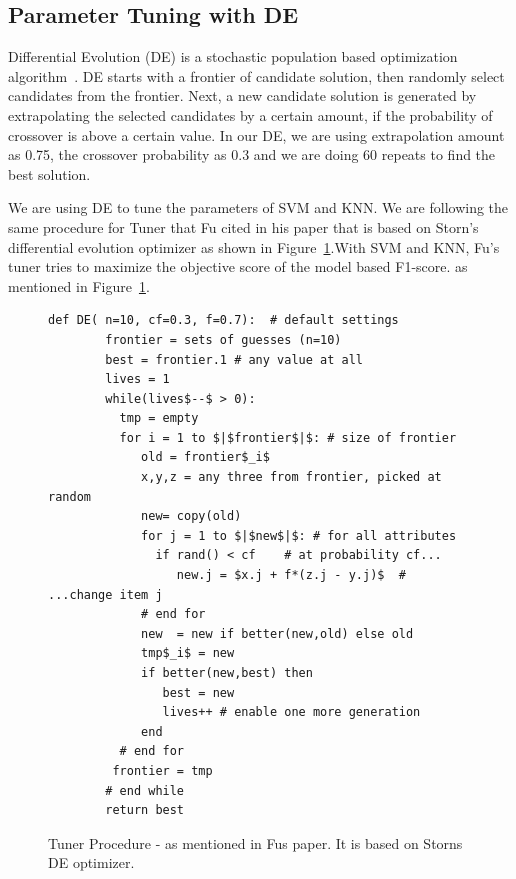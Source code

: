 \documentclass[sigconf]{acmart}
\theoremstyle{break}
\begin{document}
    \subsection{Parameter Tuning with DE}
    \label{sssec:Parameter Tuning with DE}
    Differential Evolution (DE) is a stochastic population based optimization algorithm~\cite{storn1997differential}. DE starts with a frontier of candidate solution, then randomly select candidates from the frontier. Next, a new candidate solution is generated by extrapolating the selected candidates by a certain amount, if the probability of crossover is above a certain value. In our DE, we are using extrapolation amount as 0.75, the crossover probability as 0.3 and we are doing 60 repeats to find the best solution.
    
    We are using DE to tune the parameters of SVM and KNN. We are following the same procedure for Tuner that Fu cited in his paper that is based on Storn's differential evolution optimizer as shown in Figure~\ref{fig:pseudo_DE}.With SVM and KNN, Fu's tuner tries to maximize the objective score of the model based F1-score. as mentioned in Figure~\ref{fig:pseudo_DE}.
    
    \begin{figure}[!t]
    \small 
    \begin{lstlisting}[mathescape,linewidth=6.7cm,frame=none,numbers=right ]
      def DE( n=10, cf=0.3, f=0.7):  # default settings
        frontier = sets of guesses (n=10)
        best = frontier.1 # any value at all
        lives = 1
        while(lives$--$ > 0): 
          tmp = empty
          for i = 1 to $|$frontier$|$: # size of frontier
             old = frontier$_i$
             x,y,z = any three from frontier, picked at random
             new= copy(old)  
             for j = 1 to $|$new$|$: # for all attributes
               if rand() < cf    # at probability cf...
                  new.j = $x.j + f*(z.j - y.j)$  # ...change item j
             # end for
             new  = new if better(new,old) else old
             tmp$_i$ = new 
             if better(new,best) then
                best = new
                lives++ # enable one more generation
             end                  
          # end for
         frontier = tmp
        # end while
        return best
    \end{lstlisting} 
    \caption{Tuner Procedure - as mentioned in Fu\textquotesingle s paper. It is based on Storn\textquotesingle s DE optimizer.}
    \label{fig:pseudo_DE} 
    \vspace{-0.3cm}
    \end{figure}
    
\end{document}
